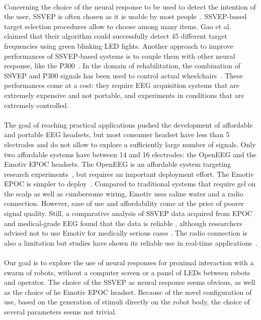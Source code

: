 \documentclass[smallextended]{svjour3}
\begin{document}
\\
Concerning the choice of the neural response to be used to detect the intention of the user, SSVEP is often chosen as it is usable by most people~\cite{Guger2012}. SSVEP-based target selection procedures allow to choose among many items. Gao et al.~\cite{SSVEPfiability} claimed that their algorithm could successfully detect 45 different target frequencies using green blinking LED lights. Another approach to improve performances of SSVEP-based systems is to couple them with other neural response, like the P300~\cite{yin2015hybrid}. In the domain of rehabilitation, the combination of SSVEP and P300 signals has been used to control actual wheelchairs~\cite{paper4}. These performances come at a cost: they require EEG acquisition systems that are extremely expensive and not portable, and experiments in conditions that are extremely controlled.\\
\\
The goal of reaching practical applications pushed the development of affordable and portable EEG headsets, but most consumer headset have less than 5 electrodes and do not allow to explore a sufficiently large number of signals. Only two affordable systems have between 14 and 16 electrodes: the OpenEEG and the Emotiv EPOC headsets. The OpenEEG is an affordable system targeting research experiments~\cite{Salehuddin2011}, but requires an important deployment effort. The Emotiv EPOC is simpler to deploy~\cite{jian2014improving,van2012designing}. Compared to traditional systems that require gel on the scalp as well as cumbersome wiring, Emotiv uses saline water and a radio connection. However, ease of use and affordability come at the price of poorer signal quality. Still, a comparative analysis of SSVEP data acquired from EPOC and medical-grade EEG found that the data is reliable \cite{liu2012implementation}, although researchers advised not to use Emotiv for medically serious cases \cite{duvinage2013performance}. The radio connection is also a limitation but studies have shown its reliable use in real-time applications~\cite{hvaring2014comparison}.\\
\\
Our goal is to explore the use of neural responses for proximal interaction with a swarm of robots, without a computer screen or a panel of LEDs between robots and operator. The choice of the SSVEP as neural response seems obvious, as well as the choice of he Emotiv EPOC headset. Because of the novel configuration of use, based on the generation of stimuli directly on the robot body, the choice of several parameters seems not trivial. \\
\end{document}
